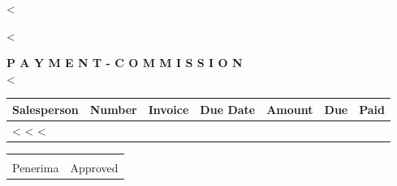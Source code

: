 <%
\usepackage{longtable}


\pagestyle{empty}
\fontsize{9pt}{10pt}\selectfont

<%

\begin{center}
\textbf{P A Y M E N T - C O M M I S S I O N}\\
<%
\end{center}

\vspace{0.3cm}

\noindent\begin{longtable}{|l|l|l|l|r|r|r|}
\hline
\textbf{Salesperson} & \textbf{Number} & \textbf{Invoice} & \textbf{Due Date} & \textbf{Amount} & \textbf{Due} & \textbf{Paid} \\
\hline
\endhead

<%
<%
<%

\hline
\multicolumn{4}{|r|}{\textbf{Total}} & \textbf{<%
\hline

\end{longtable}

\vspace{1cm}

\noindent\begin{tabular}{p{7cm}p{7cm}}
\hrulefill & \hrulefill \\
Penerima & Approved \\
\end{tabular}


